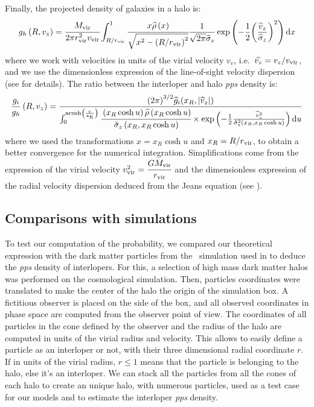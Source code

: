 Finally, the projected density of galaxies in a halo is:
%
\begin{equation}
    g_h \left(R, v_z\right) =\cfrac{M_{\rm vir}}{2\pi r_{\rm vir}^2v_{\rm vir}}
    \int_{R/r_{\rm vir}}^1
    \cfrac{x\widehat\rho \left(x\right)}{\sqrt{x^2 -
    {\left(R/r_{\rm vir}\right)}^2}}\frac{1}{\sqrt{2\pi}\widehat\sigma_z}
    \exp\left(-\frac{1}{2}{\left(\frac{\widehat v_z}{\widehat\sigma_z}\right)}^2\right){\rm{d}} x
\end{equation}
%
where we work with velocities in units of the virial velocity $v_v$, i.e.\
$\widehat{v_z}=v_z/v_{\rm vir}$, and we use the dimensionless expression of the
line-of-sight velocity dispersion (see \bartrefappendix{profiles} for details).
The ratio between the interloper and halo \emph{pps} density is:
%
\begin{equation}
    \label{eq:gi_over_gh}
    \frac{g_i}{g_h}\left(R,v_z\right)=
    \frac{{\left(2\pi\right)}^{3/2}\widehat{g}_i{(x_R,|\widehat{v}_z|)}}
        {\int_0^{\rm{acosh}\left(\frac{c}{x_R}\right)}
            \cfrac{\left(x_R\cosh{u}\right)\widehat\rho\left(x_R\cosh{u}\right)}
            {{\tilde\sigma}_z\left(x_R,x_R\cosh{u}\right)}
    \times\exp\left(-\frac{1}{2}\frac{{\widehat{v}_z}^2}
    {{\tilde\sigma}_z^2\left(x_R,x_R\cosh{u}\right)}\right){\rm{d}} u}
\end{equation}
%
where we used the transformations $x=x_R\cosh u$ and $x_R=R/r_{\rm vir}$, to obtain a
better convergence for the numerical integration. Simplifications come from the
expression of the virial velocity $v_{\rm vir}^2=\cfrac{G M_{\rm vir}}{r_{\rm vir}}$ and the
dimensionless expression of the radial velocity dispersion deduced from the
Jeans equation (see \bartrefappendix{profiles}).

\subsection{Comparisons with simulations}
\label{sub:comparisons_with_simulations}

To test our computation of the probability, we compared our theoretical
expression with the dark matter particles from the~\cite{Borgani+04} simulation
used in \citet{MBM+10} to deduce the \emph{pps} density of interlopers. For
this, a selection of high mass dark matter halos was performed on the
cosmological simulation. Then, particles coordinates were translated to make
the center of the halo the origin of the simulation box. A fictitious observer
is placed on the side of the box, and all observed coordinates in phase space
are computed from the observer point of view. The coordinates of all particles
in the cone defined by the observer and the radius of the halo are computed in
units of the virial radius and velocity. This allows to easily define a
particle as an interloper or not, with their three dimensional radial
coordinate $r$. If in units of the virial radius, $r\leqslant1$ means that the
particle is belonging to the halo, else it's an interloper. We can stack all
the particles from all the cones of each halo to create an unique halo, with
numerous particles, used as a test case for our models and to estimate the
interloper \emph{pps} density.

